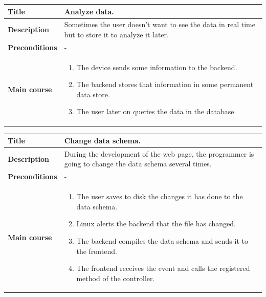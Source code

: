 \documentclass[12pt]{article}
\begin{document}
            \begin{tabularx}{\textwidth}{|l|X|}
                \hline
                \textbf{Title} & Analyze data.\\
                \hline
                \textbf{Description} & Sometimes the user doesn't want to see
                the data in real time but to store it to analyze it later.\\
                \hline
                \textbf{Preconditions} & - \\
                \hline
                \textbf{Main course} &
                    \begin{enumerate}
                        \item The device sends some information to the backend.
                        \item The backend stores that information in some
                              permanent data store.
                        \item The user later on queries the data in the
                              database.
                    \end{enumerate}\\
                \hline
            \end{tabularx}

            \begin{tabularx}{\textwidth}{|l|X|}
                \hline
                \textbf{Title} & Change data schema.\\
                \hline
                \textbf{Description} & During the development of the web page,
                the programmer is going to change the data schema several times.\\
                \hline
                \textbf{Preconditions} & - \\
                \hline
                \textbf{Main course} &
                    \begin{enumerate}
                        \item The user saves to disk the changes it has done to
                              the data schema.
                        \item Linux alerts the backend that the file has
                              changed.
                        \item The backend compiles the data schema and sends it
                              to the frontend.
                        \item The frontend receives the event and calls the
                              registered method of the controller.
                    \end{enumerate}\\
                \hline
            \end{tabularx}
\end{document}
